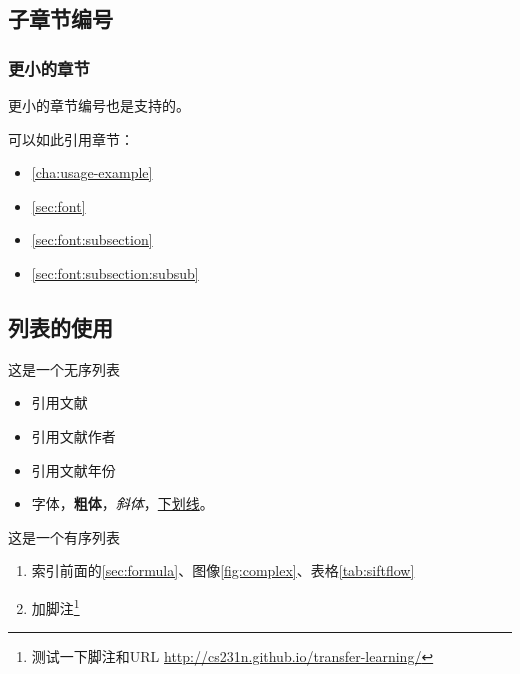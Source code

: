 \subsection{子章节编号}
\label{sec:font:subsection}
\subsubsection{更小的章节}
\label{sec:font:subsection:subsub}
更小的章节编号也是支持的。

可以如此引用章节：

\begin{itemize}
    \item \autoref{cha:usage-example}
    \item  \autoref{sec:font}
    \item  \autoref{sec:font:subsection}
    \item  \autoref{sec:font:subsection:subsub}
\end{itemize}


\subsection{列表的使用}
\label{sec:font:list}

这是一个无序列表
\begin{itemize}
    \item 引用文献\cite{long2015fully}
    \item 引用文献作者\citeauthor{long2015fully}
    \item 引用文献年份\citeyear{long2015fully} 
    \item 字体{\color{red}{变红}}，\textbf{粗体}，\textit{斜体}，\underline{下划线}。
\end{itemize}

这是一个有序列表
\begin{enumerate}
    \item 索引前面的\autoref{sec:formula}、图像\ref{fig:complex}、表格\ref{tab:siftflow}
    \item 加脚注\footnote{测{试一下}脚注和URL \url{http://cs231n.github.io/transfer-learning/}}
\end{enumerate}
